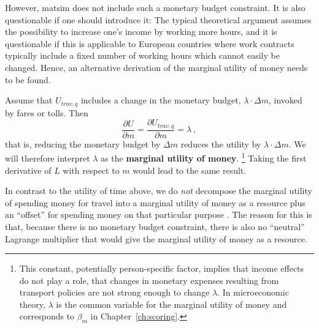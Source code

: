 However, \acrshort{matsim} does not include such a monetary budget constraint. It is also questionable if one should introduce it: The typical theoretical argument assumes the possibility to increase one's income by working more hours, and it is questionable if this is applicable to European countries where work contracts typically include a fixed number of working hours which cannot easily be changed.  
%
Hence, an alternative derivation of the marginal utility of money needs to be found.

Assume that $U_{trav,q}$ includes a change in the monetary budget, $\lambda \cdot \Delta m$, \eg invoked by fares or tolls.  Then
\begin{equation}
%
\frac{\partial U}{\partial m} 
%
= \frac{\partial U_{trav,q}}{\partial m}
%
= \lambda \ ,
\label{eq:marg-utl-of-money}
\end{equation}
that is, reducing the monetary budget by $\Delta m$ reduces the utility by $ \lambda \cdot \Delta m$.
%
We will therefore interpret $\lambda$ as the \textbf{marginal utility of money}.%
%
\footnote{\label{footnote:income-effects}
%
This constant, potentially person-specific factor, implies that income effects \citep{HerrigesKling1999Nonlinearincomeeffects,DalyEtAl2008WelfareMeasuresIncome, DagsvikKarlstrom2005ChoiceProbabilitiesInNonlinearRUM,Jara-Diaz1989IncomeEffectsInModeChoice} do not play a role, \ie that changes in monetary expenses resulting from transport policies are not strong enough to change $\lambda$. In microeconomic theory, $\lambda$ is the common variable for the marginal utility of money and corresponds to $\beta_{m}$ in Chapter~\ref{ch:scoring}.
%
}
%
Taking the first derivative of $L$ with respect to $m$ would lead to the same result.

In contrast to the utility of time above, we do \emph{not} decompose the  marginal utility of spending money for travel into a marginal utility of money as a resource plus an ``offset'' for spending money on that particular purpose \citep[for an example of this decomposition, see, e.g.][]{MunizagaEtAl2012TimeAllocationModeChoice}.  The reason for this is that, because there is no monetary budget constraint, there is also no ``neutral'' Lagrange multiplier that would give the marginal utility of money as a resource.

